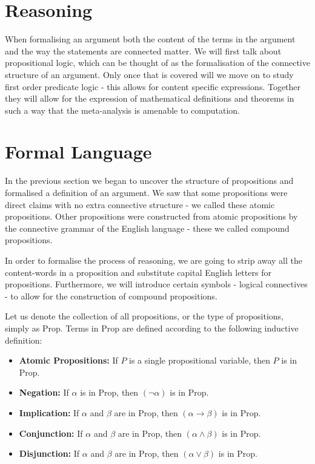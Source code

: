 \documentclass{book}
\begin{document}
\section{Reasoning}

When formalising an argument both the content of the terms in the argument and the way the statements are connected matter. We will first talk about propositional logic, which can be thought of as the formalisation of the connective structure of an argument. Only once that is covered will we move on to study first order predicate logic - this allows for content specific expressions. Together they will allow for the expression of mathematical definitions and theorems in such a way that the meta-analysis is amenable to computation. 

\section{Formal Language}


In the previous section we began to uncover the structure of propositions and formalised a definition of an argument. We saw that some propositions were direct claims with no extra connective structure - we called these atomic propositions. Other propositions were constructed from atomic propositions by the connective grammar of the English language - these we called compound propositions. 

In order to formalise the process of reasoning, we are going to strip away all the content-words in a proposition and substitute capital English letters for propositions. Furthermore, we will introduce certain symbols - logical connectives - to allow for the construction of compound propositions. 






Let us denote the collection of all propositions, or the type of propositions, simply as Prop. Terms in Prop are defined according to the following inductive definition: 

\begin{itemize}
    \item {\bf Atomic Propositions:} If $P$ is a single propositional variable, then $P$ is in Prop.
    \item {\bf Negation:} If $\alpha$ is in Prop, then $(\lnot\alpha)$ is in Prop. 
    \item {\bf Implication:} If $\alpha$ and $\beta$ are in Prop, then $(\alpha \to \beta)$ is in Prop.
    \item {\bf Conjunction:} If $\alpha$ and $\beta$ are in Prop, then $(\alpha \land \beta)$ is in Prop.
    \item {\bf Disjunction:} If $\alpha$ and $\beta$ are in Prop, then $(\alpha \lor \beta)$ is in Prop. 		
\end{itemize}
\end{document}
